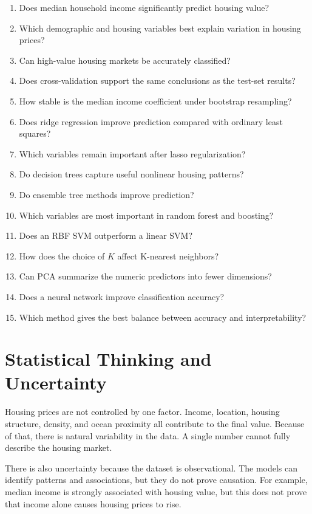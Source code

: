 \documentclass[12pt]{report}
\begin{document}
\begin{enumerate}
    \item Does median household income significantly predict housing value?
    \item Which demographic and housing variables best explain variation in housing prices?
    \item Can high-value housing markets be accurately classified?
    \item Does cross-validation support the same conclusions as the test-set results?
    \item How stable is the median income coefficient under bootstrap resampling?
    \item Does ridge regression improve prediction compared with ordinary least squares?
    \item Which variables remain important after lasso regularization?
    \item Do decision trees capture useful nonlinear housing patterns?
    \item Do ensemble tree methods improve prediction?
    \item Which variables are most important in random forest and boosting?
    \item Does an RBF SVM outperform a linear SVM?
    \item How does the choice of \(K\) affect K-nearest neighbors?
    \item Can PCA summarize the numeric predictors into fewer dimensions?
    \item Does a neural network improve classification accuracy?
    \item Which method gives the best balance between accuracy and interpretability?
\end{enumerate}

\section{Statistical Thinking and Uncertainty}

Housing prices are not controlled by one factor. Income, location, housing structure, density, and ocean proximity all contribute to the final value. Because of that, there is natural variability in the data. A single number cannot fully describe the housing market.

There is also uncertainty because the dataset is observational. The models can identify patterns and associations, but they do not prove causation. For example, median income is strongly associated with housing value, but this does not prove that income alone causes housing prices to rise.
\end{document}

